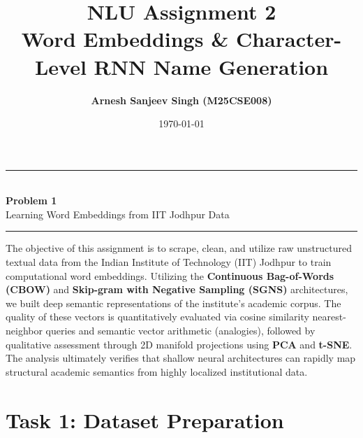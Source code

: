 \documentclass[11pt,a4paper]{article}
\title{\Huge\textbf{\color{iitjblue} NLU Assignment 2}\\[0.5em]
       \LARGE\color{iitjblue!80} Word Embeddings \& Character-Level RNN Name Generation}
\author{\Large\textbf{Arnesh Sanjeev Singh (M25CSE008)}}
\date{\large \today}
\begin{document}
\maketitle
\vspace{1em}

\onehalfspacing
\justifying

\tableofcontents
\clearpage


{\centering
\rule{\textwidth}{1.5pt}\\[0.8em]
{\Huge\bfseries\color{iitjblue} Problem 1}\\[0.3em]
{\LARGE\color{iitjblue!80} Learning Word Embeddings from IIT Jodhpur Data}\\[0.8em]
\rule{\textwidth}{1.5pt}\par
}
\vspace{1.5em}

\begin{infoBox}
The objective of this assignment is to scrape, clean, and utilize raw unstructured textual data from the Indian Institute of Technology (IIT) Jodhpur to train computational word embeddings. Utilizing the \textbf{Continuous Bag-of-Words (CBOW)} and \textbf{Skip-gram with Negative Sampling (SGNS)} architectures, we built deep semantic representations of the institute's academic corpus. The quality of these vectors is quantitatively evaluated via cosine similarity nearest-neighbor queries and semantic vector arithmetic (analogies), followed by qualitative assessment through 2D manifold projections using \textbf{PCA} and \textbf{t-SNE}. The analysis ultimately verifies that shallow neural architectures can rapidly map structural academic semantics from highly localized institutional data.
\end{infoBox}

\vspace{1em}

\section{Task 1: Dataset Preparation}
\end{document}

